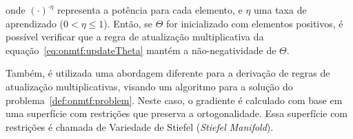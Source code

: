 \documentclass[
    12pt,                %
    oneside,            %
    a4paper,            %
    english,            %
    brazil                %
    ]{abntex2ppgsi}
\begin{document}
onde $(\cdot)^{\cdot \eta}$ representa a potência para cada elemento, e $\eta$ uma taxa de aprendizado ($0 < \eta \leq 1$).
Então, se $\Theta$ for inicializado com elementos positivos, é possível verificar que a regra de atualização multiplicativa da equação~\ref{eq:onmtf:updateTheta} mantém a não-negatividade de $\Theta$.

Também, é utilizada uma abordagem diferente para a derivação de regras de atualização multiplicativas, visando um algoritmo para a solução do problema~\ref{def:onmtf:problem}.
Neste caso, o gradiente é calculado com base em uma superfície com restrições que preserva a ortogonalidade.
Essa superfície com restrições é chamada de Variedade de Stiefel (\textit{Stiefel Manifold}).





\end{document}
